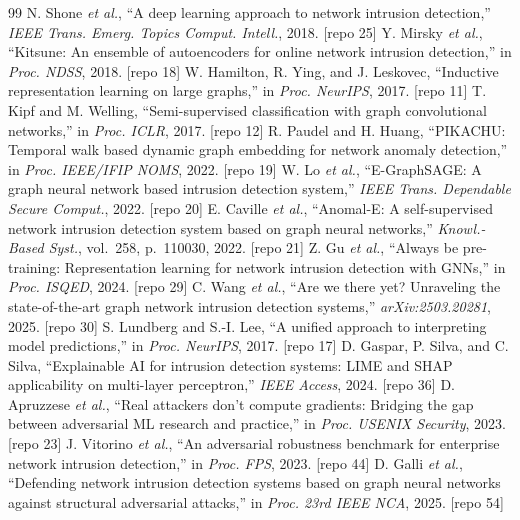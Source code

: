 \documentclass[conference]{IEEEtran}
\begin{document}
\begin{thebibliography}{99}
 N. Shone \textit{et al.}, ``A deep learning approach to network intrusion detection,'' \textit{IEEE Trans. Emerg. Topics Comput. Intell.}, 2018. [repo 25]
 Y. Mirsky \textit{et al.}, ``Kitsune: An ensemble of autoencoders for online network intrusion detection,'' in \textit{Proc. NDSS}, 2018. [repo 18]
 W. Hamilton, R. Ying, and J. Leskovec, ``Inductive representation learning on large graphs,'' in \textit{Proc. NeurIPS}, 2017. [repo 11]
 T. Kipf and M. Welling, ``Semi-supervised classification with graph convolutional networks,'' in \textit{Proc. ICLR}, 2017. [repo 12]
 R. Paudel and H. Huang, ``PIKACHU: Temporal walk based dynamic graph embedding for network anomaly detection,'' in \textit{Proc. IEEE/IFIP NOMS}, 2022. [repo 19]
 W. Lo \textit{et al.}, ``E-GraphSAGE: A graph neural network based intrusion detection system,'' \textit{IEEE Trans. Dependable Secure Comput.}, 2022. [repo 20]
 E. Caville \textit{et al.}, ``Anomal-E: A self-supervised network intrusion detection system based on graph neural networks,'' \textit{Knowl.-Based Syst.}, vol.~258, p.~110030, 2022. [repo 21]
 Z. Gu \textit{et al.}, ``Always be pre-training: Representation learning for network intrusion detection with GNNs,'' in \textit{Proc. ISQED}, 2024. [repo 29]
 C. Wang \textit{et al.}, ``Are we there yet? Unraveling the state-of-the-art graph network intrusion detection systems,'' \textit{arXiv:2503.20281}, 2025. [repo 30]
 S. Lundberg and S.-I. Lee, ``A unified approach to interpreting model predictions,'' in \textit{Proc. NeurIPS}, 2017. [repo 17]
 D. Gaspar, P. Silva, and C. Silva, ``Explainable AI for intrusion detection systems: LIME and SHAP applicability on multi-layer perceptron,'' \textit{IEEE Access}, 2024. [repo 36]
 D. Apruzzese \textit{et al.}, ``Real attackers don't compute gradients: Bridging the gap between adversarial ML research and practice,'' in \textit{Proc. USENIX Security}, 2023. [repo 23]
 J. Vitorino \textit{et al.}, ``An adversarial robustness benchmark for enterprise network intrusion detection,'' in \textit{Proc. FPS}, 2023. [repo 44]
 D. Galli \textit{et al.}, ``Defending network intrusion detection systems based on graph neural networks against structural adversarial attacks,'' in \textit{Proc. 23rd IEEE NCA}, 2025. [repo 54]
\end{thebibliography}
\end{document}
